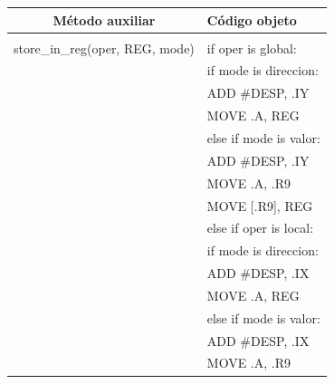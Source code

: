 \documentclass[11pt, , a4paper, titlepage]{article}
\newenvironment{changemargin}[2]{%
\begin{list}{}{%
\setlength{\topsep}{0pt}%
\setlength{\leftmargin}{#1}%
\setlength{\rightmargin}{#2}%
\setlength{\listparindent}{\parindent}%
\setlength{\itemindent}{\parindent}%
\setlength{\parsep}{\parskip}%
}%
\item[]}{\end{list}}
\begin{document}
\begin{changemargin}{+5cm}{+5cm}
\begin{table}[H]
    \centering
    \begin{tabular}{cl}
        \large \textbf{Método auxiliar} & \large \textbf{Código objeto} \\
        \hline  & \\[-2mm]
        store\_in\_reg(oper, REG, mode) 
        & if oper is global:  \\
        & \hspace*{6mm} if mode is direccion: \\
        & \hspace*{6mm} \hspace*{6mm}  ADD \#DESP, .IY \\
        & \hspace*{6mm} \hspace*{6mm}  MOVE .A, REG \\
        & \hspace*{6mm} else if mode is valor: \\
        & \hspace*{6mm} \hspace*{6mm}  ADD \#DESP, .IY \\
        & \hspace*{6mm} \hspace*{6mm}  MOVE .A, .R9 \\
        & \hspace*{6mm} \hspace*{6mm}  MOVE [.R9], REG \\
        & else if oper is local:  \\
        & \hspace*{6mm} if mode is direccion: \\
        & \hspace*{6mm} \hspace*{6mm}  ADD \#DESP, .IX \\
        & \hspace*{6mm} \hspace*{6mm}  MOVE .A, REG \\
        & \hspace*{6mm} else if mode is valor: \\
        & \hspace*{6mm} \hspace*{6mm}  ADD \#DESP, .IX \\
        & \hspace*{6mm} \hspace*{6mm}  MOVE .A, .R9 \\

\end{tabular}
\end{table}
\end{changemargin}
\end{document}
